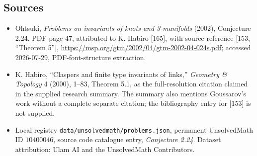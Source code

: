 \documentclass[11pt]{article}
\begin{document}
\subsection{Sources}
\begin{itemize}
\item Ohtsuki, \emph{Problems on invariants of knots and 3-manifolds} (2002), Conjecture 2.24, PDF page 47, attributed to K. Habiro [165], with source reference [153, ``Theorem 5''], \url{https://msp.org/gtm/2002/04/gtm-2002-04-024s.pdf}; accessed 2026-07-29, PDF-font-structure extraction.
\item K. Habiro, ``Claspers and finite type invariants of links,'' \emph{Geometry \& Topology} 4 (2000), 1--83, Theorem 5.1, as the full-resolution citation claimed in the supplied research summary. The summary also mentions Goussarov's work without a complete separate citation; the bibliography entry for [153] is not supplied.
\item Local registry \texttt{data/unsolvedmath/problems.json}, permanent UnsolvedMath ID $10400046$, source code catalogue entry, \emph{Conjecture 2.24}. Dataset attribution: Ulam AI and the UnsolvedMath Contributors.
\end{itemize}
\end{document}
